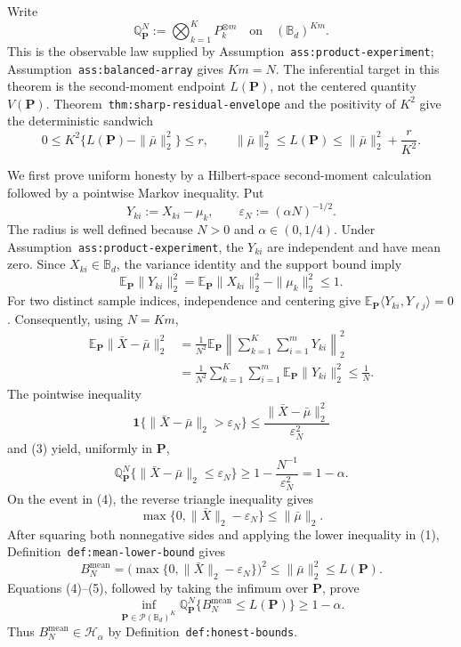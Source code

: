 Write
\[
\mathbb Q_{\mathbf P}^{N}
:=\bigotimes_{k=1}^{K}P_k^{\otimes m}
\quad\text{on}\quad
(\mathbb B_d)^{Km}.
\]
This is the observable law supplied by Assumption~\texttt{ass:product-experiment}; Assumption~\texttt{ass:balanced-array} gives \(Km=N\).  The inferential target in this theorem is the second-moment endpoint \(L(\mathbf P)\), not the centered quantity \(V(\mathbf P)\).  Theorem~\texttt{thm:sharp-residual-envelope} and the positivity of \(K^2\) give the deterministic sandwich
\[
0\le K^2\{L(\mathbf P)-\|\bar\mu\|_2^2\}\le r,
\qquad
\|\bar\mu\|_2^2\le L(\mathbf P)
\le \|\bar\mu\|_2^2+\frac r{K^2}.                                      \tag{1}
\]

We first prove uniform honesty by a Hilbert-space second-moment calculation followed by a pointwise Markov inequality.  Put
\[
Y_{ki}:=X_{ki}-\mu_k,
\qquad
\varepsilon_N:=(\alpha N)^{-1/2}.
\]
The radius is well defined because \(N>0\) and \(\alpha\in(0,1/4)\).  Under Assumption~\texttt{ass:product-experiment}, the \(Y_{ki}\) are independent and have mean zero.  Since \(X_{ki}\in\mathbb B_d\), the variance identity and the support bound imply
\[
\mathbb E_{\mathbf P}\|Y_{ki}\|_2^2
=\mathbb E_{\mathbf P}\|X_{ki}\|_2^2-\|\mu_k\|_2^2
\le 1.                                                                    \tag{2}
\]
For two distinct sample indices, independence and centering give
\(
\mathbb E_{\mathbf P}\langle Y_{ki},Y_{\ell j}\rangle=0
\).
Consequently, using \(N=Km\),
\[
\begin{aligned}
\mathbb E_{\mathbf P}\|\bar X-\bar\mu\|_2^2
&=\frac1{N^2}
  \mathbb E_{\mathbf P}
  \left\|\sum_{k=1}^{K}\sum_{i=1}^{m}Y_{ki}\right\|_2^2 \\
&=\frac1{N^2}\sum_{k=1}^{K}\sum_{i=1}^{m}
  \mathbb E_{\mathbf P}\|Y_{ki}\|_2^2
\le \frac1N.
\end{aligned}                                                             \tag{3}
\]
The pointwise inequality
\[
\mathbf 1\{\|\bar X-\bar\mu\|_2>\varepsilon_N\}
\le \frac{\|\bar X-\bar\mu\|_2^2}{\varepsilon_N^2}
\]
and (3) yield, uniformly in \(\mathbf P\),
\[
\mathbb Q_{\mathbf P}^{N}
\{\|\bar X-\bar\mu\|_2\le\varepsilon_N\}
\ge 1-\frac{N^{-1}}{\varepsilon_N^2}=1-\alpha.                            \tag{4}
\]
On the event in (4), the reverse triangle inequality gives
\[
\max\{0,\|\bar X\|_2-\varepsilon_N\}
\le \|\bar\mu\|_2.
\]
After squaring both nonnegative sides and applying the lower inequality in (1), Definition~\texttt{def:mean-lower-bound} gives
\[
B_N^{\mathrm{mean}}
=\bigl(\max\{0,\|\bar X\|_2-\varepsilon_N\}\bigr)^2
\le \|\bar\mu\|_2^2
\le L(\mathbf P).                                                         \tag{5}
\]
Equations (4)--(5), followed by taking the infimum over \(\mathbf P\), prove
\[
\inf_{\mathbf P\in\mathcal P(\mathbb B_d)^K}
\mathbb Q_{\mathbf P}^{N}
\{B_N^{\mathrm{mean}}\le L(\mathbf P)\}
\ge1-\alpha.
\]
Thus \(B_N^{\mathrm{mean}}\in\mathcal H_\alpha\) by Definition~\texttt{def:honest-bounds}.

